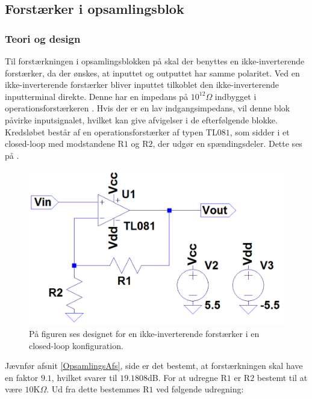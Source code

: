 \subsection{Forstærker i opsamlingsblok}\label{Subsec:Forstaerker}
\subsubsection{Teori og design}
Til forstærkningen i opsamlingsblokken på  skal der benyttes en ikke-inverterende forstærker, da der ønskes, at inputtet og outputtet har samme polaritet. Ved en ikke-inverterende forstærker bliver inputtet tilkoblet den ikke-inverterende inputterminal direkte. Denne har en impedans på $10^{12}\Omega$ indbygget i operationsforstærkeren \cite{Corporation1995}. Hvis der er en lav indgangsimpedans, vil denne blok påvirke inputsignalet, hvilket kan give afvigelser i de efterfølgende blokke. \\
Kredsløbet består af en operationsforstærker af typen TL$081$, som sidder i et closed-loop med modstandene R$1$ og R$2$, der udgør en spændingsdeler. Dette ses på .
\begin{figure}[H]
\centering
\includegraphics[scale=0.45]{figures/cProblemloesning/Forstaerker.PNG}
\caption{På figuren ses designet for en ikke-inverterende forstærker i en closed-loop konfiguration.}
\label{fig:Forstaerker}
\end{figure} 
\noindent Jævnfør afsnit \ref{OpsamlingsAfs}, side \pageref{OpsamlingsAfs} er det bestemt, at forstærkningen skal have en faktor $9.1$, hvilket svarer til $19.1808$dB. For at udregne R$1$ er R$2$ bestemt til at være $10$K$\Omega$. \cite{Nilsson2011} Ud fra dette bestemmes R$1$ ved følgende udregning:
